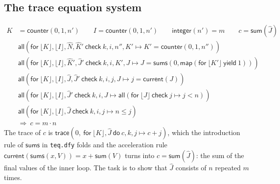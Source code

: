 \documentclass[11pt,a4paper]{article}
\newcommand{\bl}[1]{\lfloor #1\rfloor}                       %
\newcommand{\tr}[3]{\mathsf{trace}(#1,\ \mathsf{for}\ #2\ \mathsf{do}\ #3)}
\newcommand{\mapc}[2]{\mathsf{map}(\mathsf{for}\ #1\ \mathsf{yield}\ #2)}
\newcommand{\al}[2]{\mathsf{all}(\mathsf{for}\ #1\ \mathsf{check}\ #2)}
\newcommand{\cnt}{\mathsf{counter}}
\newcommand{\cur}{\mathsf{current}}
\newcommand{\intf}{\mathsf{integer}}
\newcommand{\sums}{\mathsf{sums}}
\newcommand{\seq}[1]{\hat{#1}}                               %
\begin{document}
\subsection{The trace equation system}
\begin{align}
  K &= \cnt(0, 1, n') \qquad I = \cnt(0, 1, n') \qquad \intf(n') = m \qquad c = \mathsf{sum}(\seq{J}) \label{eq:ns0}\\
  &\al{\bl{K}, \bl{I}, \seq{N}, \seq{K}'}{k, i, n'', K' \mapsto K' = \cnt(0, 1, n'')} \label{eq:ns1}\\
  &\al{\bl{K}, \bl{I}, \seq{K}', \seq{J}'}{k, i, K', J \mapsto J = \sums(0, \mapc{\bl{K'}}{1})} \label{eq:ns2}\\
  &\al{\bl{K}, \bl{I}, \seq{J}, \seq{J}'}{k, i, j, J \mapsto j = \cur(J)} \label{eq:ns3}\\
  &\al{\bl{K}, \bl{I}, \seq{J}'}{k, i, J \mapsto \al{\bl{J}}{j \mapsto j < n}} \label{eq:ns4}\\
  &\al{\bl{K}, \bl{I}, \seq{J}}{k, i, j \mapsto n \le j} \label{eq:ns5}\\
  &\Longrightarrow\ c = m \cdot n \nonumber
\end{align}
The trace of $c$ is $\tr{0}{\bl{K}, \seq{J}}{c, k, j \mapsto c + j}$, which the introduction rule of
$\sums$ in \texttt{teq.dfy} folds and the acceleration rule $\cur(\sums(x, V)) = x + \mathsf{sum}(V)$
turns into $c = \mathsf{sum}(\seq{J})$: the sum of the final values of the inner loop. The task is to
show that $\seq{J}$ consists of $n$ repeated $m$ times.
\end{document}
